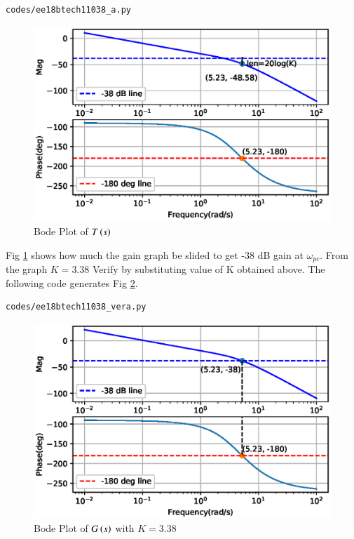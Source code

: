 \begin{lstlisting}
codes/ee18btech11038_a.py
\end{lstlisting}

\begin{figure}[!ht]
\centering
\includegraphics[width=\columnwidth]{./figs/ee18btech11038_a.eps}
\caption{Bode Plot of $T\left(s\right)$}
\label{fig:ee18btech11038_a}
\end{figure}
Fig \ref{fig:ee18btech11038_a} shows how much the gain graph be slided to get -38 dB gain at $\omega_{pc}$.
From the graph $K = 3.38$
Verify by substituting value of K obtained above. 
The following code generates Fig \ref{fig:ee18btech11038_vera}.

\begin{lstlisting}
codes/ee18btech11038_vera.py
\end{lstlisting}

\begin{figure}[!h]
\centering
\includegraphics[width=\columnwidth]{./figs/ee18btech11038_vera.eps}
\caption{Bode Plot of $G\left(s\right)$ with $K=3.38$ }
\label{fig:ee18btech11038_vera}
\end{figure}

